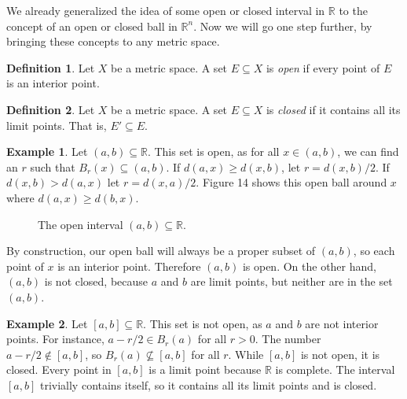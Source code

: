 \documentclass{article}
\newcommand{\R}{\mathbb{R}}
\theoremstyle{definition}
\newtheorem{definition}{Definition}[section]
\newtheorem{example}{Example}[section]
\begin{document}
	We already generalized the idea of some open or closed interval in $ \R $ to the concept of an open or closed ball in $ \R^n $. Now we will go one step further, by bringing these concepts to any metric space. 
	\begin{definition}\label{def2.10}
		Let $ X $ be a metric space. A set $ E\subseteq X $ is \textit{\color{red}open} if every point of $ E $ is an interior point.  
	\end{definition}
	\begin{definition}\label{def2.11}
		Let $ X $ be a metric space. A set $ E\subseteq X $ is \textit{\color{red}closed} if it contains all its limit points. That is, $ E'\subseteq E $. 
	\end{definition}
	\begin{example}
		Let $ (a,b)\subseteq\R $. This set is open, as for all $ x\in(a,b) $, we can find an $ r $ such that $ B_r(x)\subseteq(a,b) $. If $ d(a,x)\ge d(x,b) $, let $ r=d(x,b)/2 $. If $ d(x,b)>d(a,x) $ let $ r=d(x,a)/2 $.  Figure 14 shows this open ball around $ x $ where $ d(a,x)\ge d(b,x) $.
		\begin{figure}[h]
			\centering
			\caption{The open interval $ (a,b)\subseteq \R $.}
		\end{figure}
		By construction, our open ball will always be a proper subset of $ (a,b) $, so each point of $ x $ is an interior point. Therefore $ (a,b) $ is open. On the other hand, $ (a,b) $ is not closed, because $ a $ and $ b $ are limit points, but neither are in the set $ (a,b) $.
	\end{example}
	\begin{example}
		Let $ [a,b]\subseteq\R $. This set is not open, as $ a $ and $ b $ are not interior points. For instance, $ a-r/2\in B_r(a) $ for all $ r>0 $. The number $ a-r/2\notin[a,b] $, so $ B_r(a)\not\subseteq[a,b] $ for all $ r $. While $ [a,b] $ is not open, it is closed. Every point in $ [a,b] $ is a limit point because $ \R $ is complete. The interval $ [a,b] $ trivially contains itself, so it contains all its limit points and is closed. 
	\end{example}
\end{document}
